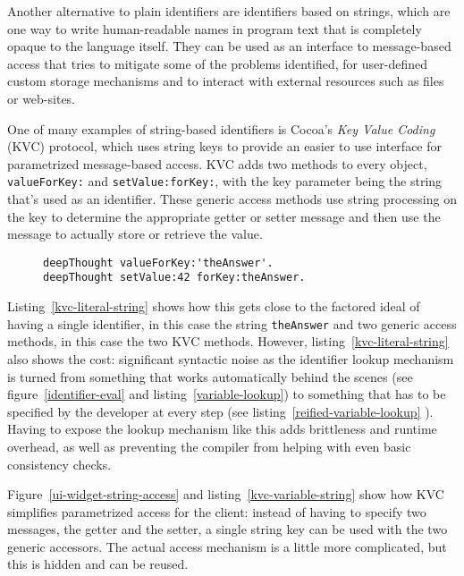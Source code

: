 \documentclass[preprint,authoryear]{llncs}
\begin{document}
Another alternative to plain identifiers are identifiers based on strings, which are one 
way to write human-readable names in program text that is completely opaque to the language itself.
They can be used as an interface to message-based access that tries to mitigate some of the problems
identified, for user-defined custom storage
mechanisms and to interact with external resources such as files or web-sites.


One of many examples of string-based identifiers is Cocoa's \emph{Key Value Coding} (KVC)\cite{KVC} protocol,
which uses string keys to provide
an easier to use interface for parametrized message-based access.  
KVC adds two methods to every object, {\tt valueForKey:} and {\tt setValue:forKey:},
with the key parameter being the string that's used as an identifier.  These generic access methods 
use string processing on the key to determine the appropriate getter or setter message and 
then use the message to actually store or retrieve the value.  

\begin{figure}[htbp]
\begin{lstlisting}[style=numbers,label=kvc-literal-string,caption=Strings used with \emph{Key Value Coding} (KVC).]
deepThought valueForKey:'theAnswer'.
deepThought setValue:42 forKey:theAnswer.
\end{lstlisting}
\end{figure}

Listing~\ref{kvc-literal-string} shows how this gets close to the factored ideal of having a single identifier,
in this case the string {\tt theAnswer} and two generic access methods, in this case the two KVC methods.
However, listing~\ref{kvc-literal-string} also shows the cost:  significant syntactic noise as the identifier
lookup mechanism is turned from something that works automatically behind the scenes (see figure~\ref{identifier-eval}
and listing~\ref{variable-lookup}) to something that has to be specified by the developer at every step (see 
listing~\ref{reified-variable-lookup} ).   Having to expose the lookup mechanism like this adds brittleness and
runtime overhead, as well as preventing the compiler from helping with even basic consistency checks.


Figure~\ref{ui-widget-string-access} and listing~\ref{kvc-variable-string} show how KVC simplifies parametrized access for 
the client:  instead of having to specify two messages, the getter and the setter, a single string key can be used with
the two generic accessors.  The actual access mechanism is a little more complicated, but this is hidden and can 
be reused.
\end{document}
